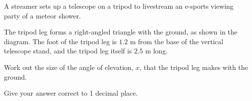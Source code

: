 \begin{question}
\noindent A streamer sets up a telescope on a tripod to livestream an e-sports viewing party of a meteor shower.

The tripod leg forms a right-angled triangle with the ground, as shown in the diagram. The foot of the tripod leg is $1.2$ m from the base of the vertical telescope stand, and the tripod leg itself is $2.5$ m long.

\begin{center}
\end{center}

\noindent Work out the size of the angle of elevation, $x$, that the tripod leg makes with the ground.

Give your answer correct to 1 decimal place.
\vspace{4.5cm}
\begin{flushright}
\end{flushright}
\end{question}

